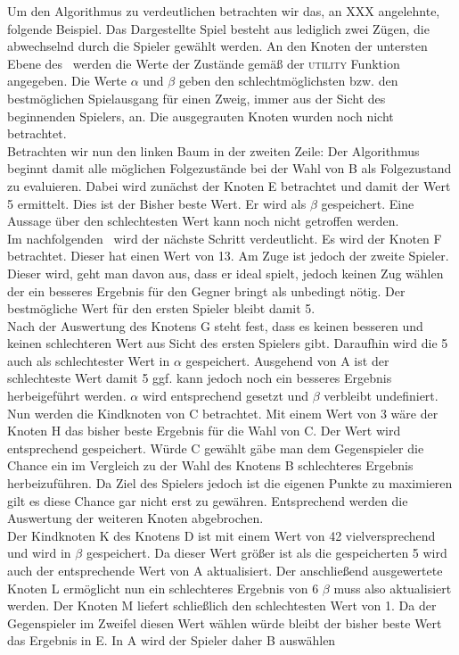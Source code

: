 Um den Algorithmus zu verdeutlichen betrachten wir das, an  XXX angelehnte, folgende Beispiel. Das Dargestellte Spiel besteht aus lediglich zwei Zügen, die abwechselnd durch die Spieler gewählt werden. An den Knoten der untersten Ebene des \gtree\ werden die Werte der Zustände gemäß der \textsc{utility} Funktion angegeben. Die Werte $\alpha$ und $\beta$ geben den schlechtmöglichsten bzw. den bestmöglichen Spielausgang für einen Zweig, immer aus der Sicht des beginnenden Spielers, an. Die ausgegrauten Knoten wurden noch nicht betrachtet.\\
Betrachten wir nun den linken Baum in der zweiten Zeile: Der Algorithmus beginnt damit alle möglichen Folgezustände bei der Wahl von B als Folgezustand zu evaluieren. Dabei wird zunächst der Knoten E betrachtet und damit der Wert 5 ermittelt. Dies ist der Bisher beste Wert. Er wird als $\beta$ gespeichert. Eine Aussage über den schlechtesten Wert kann noch nicht getroffen werden.\\
Im nachfolgenden \gtree\ wird der nächste Schritt verdeutlicht. Es wird der Knoten F betrachtet. Dieser hat einen Wert von 13. Am Zuge ist jedoch der zweite Spieler. Dieser wird, geht man davon aus, dass er ideal spielt, jedoch keinen Zug wählen der ein besseres Ergebnis für den Gegner bringt als unbedingt nötig. Der bestmögliche Wert für den ersten Spieler bleibt damit 5.\\
Nach der Auswertung des Knotens G steht fest, dass es keinen besseren und keinen schlechteren Wert aus Sicht des ersten Spielers gibt. Daraufhin wird die 5 auch als schlechtester Wert in $\alpha$ gespeichert. Ausgehend von A  ist der schlechteste Wert damit 5 ggf. kann jedoch noch ein besseres Ergebnis herbeigeführt werden. $\alpha$ wird entsprechend gesetzt und $\beta$ verbleibt undefiniert.\\
Nun werden die Kindknoten von C betrachtet. Mit einem Wert von 3 wäre der Knoten H das bisher beste Ergebnis für die Wahl von C. Der Wert wird entsprechend gespeichert. Würde C gewählt gäbe man dem Gegenspieler die Chance ein im Vergleich zu der Wahl des Knotens B schlechteres Ergebnis herbeizuführen. Da Ziel des Spielers jedoch ist die eigenen Punkte zu maximieren gilt es diese Chance gar nicht erst zu gewähren. Entsprechend werden die Auswertung der weiteren Knoten abgebrochen.\\
Der Kindknoten K des Knotens D ist mit einem Wert von 42 vielversprechend und wird in $\beta$ gespeichert. Da dieser Wert größer ist als die gespeicherten 5 wird auch der entsprechende Wert von A aktualisiert. Der anschließend ausgewertete Knoten L ermöglicht nun ein schlechteres Ergebnis von 6 $\beta$ muss also aktualisiert werden. Der Knoten M liefert schließlich den schlechtesten Wert von 1. Da der Gegenspieler im Zweifel diesen Wert wählen würde bleibt der bisher beste Wert das Ergebnis in E. In A wird der Spieler daher B auswählen
